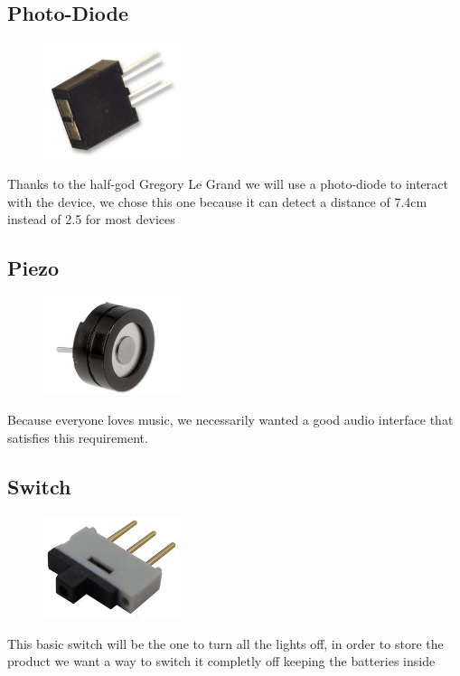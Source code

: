 \documentclass[12pt,a4paper,landscape]{article}
\begin{document}
\begin{multicols}{2}
			\vspace{4cm}

	\subsection*{Photo-Diode}
			\begin{figure}[H]
			\centering
			\includegraphics[width=4cm]{images/photo-diode.png}
			\end{figure}
			Thanks to the half-god Gregory Le Grand we will use a photo-diode to interact with the device, we chose this one because it can detect a distance of 7.4cm instead of 2.5 for most devices

	\subsection*{Piezo}
			\begin{figure}[H]
			\centering
			\includegraphics[width=4cm]{images/piezo.png}
			\end{figure}
			Because everyone loves music, we necessarily wanted a good audio interface that satisfies this requirement.

	\subsection*{Switch}
			\begin{figure}[H]
			\centering
			\includegraphics[width=4cm]{images/switch.png}
			\end{figure}
			This basic switch will be the one to turn all the lights off, in order to store the product we want a way to switch it completly off keeping the batteries inside


\end{multicols}
\end{document}
